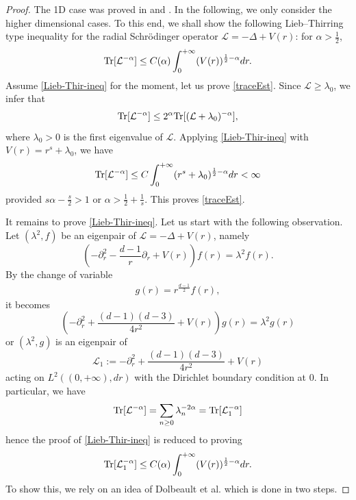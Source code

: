 \documentclass[%
11pt,  reqno]{amsart}
\theoremstyle{remarkstyle}
\newcommand{\1}{\hspace{0.2mm}\text{I}\hspace{0.2mm}}
\renewcommand{\L}{\mathcal{L}}
\newcommand{\al}{\alpha}
\newcommand{\ld}{\lambda}
\numberwithin{equation}{section}
\numberwithin{theorem}{section}
\begin{document}
	\begin{proof}
		The 1D case was proved in \cite[Example 3.2]{LNR15} and \cite[Lemma A.1]{DR23}. In the following, we only consider the higher dimensional cases. To this end, we shall show the following Lieb--Thirring type inequality for the radial Schr\"odinger operator $\L = -\Delta + V(r)$: for $\al>\frac12$,
		\begin{align} \label{Lieb-Thir-ineq}
			{\rm Tr}[\L^{-\al}] \leq C(\alpha) \int_0^{+\infty} (V(r))^{\frac{1}{2}-\al} dr.
		\end{align}
		Assume \eqref{Lieb-Thir-ineq} for the moment, let us prove \eqref{traceEst}. Since $\L \geq \ld_0$, we infer that
		\[
		{\rm Tr}[\L^{-\al}] \leq 2^\al {\rm Tr}[(\L+\ld_0)^{-\al}],
		\]
		where $\ld_0>0$ is the first eigenvalue of $\L$. Applying \eqref{Lieb-Thir-ineq} with $V(r)=r^s+\ld_0$, we have
		\[
		{\rm Tr}[\L^{-\al}]\leq C\int_0^{+\infty} (r^s+\ld_0)^{\frac12 - \al} dr <\infty
		\]
		provided $s\al-\frac{s}{2} >1$ or $\al>\frac12 + \frac1s$. This proves \eqref{traceEst}.	
		
		It remains to prove \eqref{Lieb-Thir-ineq}. Let us start with the following observation. Let $(\ld^2, f)$ be an eigenpair of $\L=-\Delta +V(r)$, namely
		$$
		\left(-\partial^2_r -\frac{d-1}{r}\partial_r + V(r)\right) f(r) = \ld^2 f(r). 
		$$
		By the change of variable 
		\begin{align}\label{chan-vari}
			g(r) = r^{\frac{d-1}{2}} f(r),
		\end{align}
		it becomes
		$$
		\left(-\partial^2_r +\frac{(d-1)(d-3)}{4r^2} + V(r) \right) g(r) = \ld^2 g(r)
		$$
		or $(\ld^2, g)$ is an eigenpair of 
		$$
		\L_1 := -\partial^2_r +\frac{(d-1)(d-3)}{4r^2} + V(r)
		$$
		acting on $L^2((0,+\infty),dr)$ with the Dirichlet boundary condition at $0$. In particular, we have
		\begin{align}\label{TraceL1}
			{\rm Tr}[\L^{-\al}] = \sum_{n\ge 0} \ld_n^{-2\al} = {\rm Tr}[\L_1^{-\al}]
		\end{align}
		hence the proof of \eqref{Lieb-Thir-ineq} is reduced to proving
		\begin{align} \label{LT-proof}
			{\rm Tr}[\L_1^{-\al}] \le C(\alpha) \int_0^{+\infty} (V(r))^{\frac{1}{2}-\al} dr.
		\end{align}
		To show this, we rely on an idea of Dolbeault et al. \cite{DFLP06} which is done in two steps. 
		

\end{proof}
\end{document}
